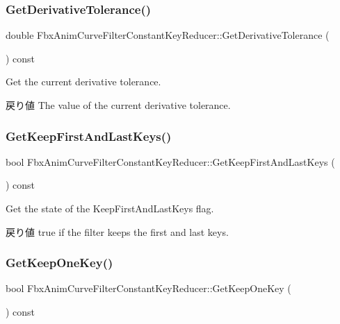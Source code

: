 \subsubsection{\texorpdfstring{Get\+Derivative\+Tolerance()}{GetDerivativeTolerance()}}
{\footnotesize\ttfamily double Fbx\+Anim\+Curve\+Filter\+Constant\+Key\+Reducer\+::\+Get\+Derivative\+Tolerance (\begin{DoxyParamCaption}{ }\end{DoxyParamCaption}) const}

Get the current derivative tolerance. \begin{DoxyReturn}{戻り値}
The value of the current derivative tolerance. 
\end{DoxyReturn}
\mbox{\label{class_fbx_anim_curve_filter_constant_key_reducer_acb96f386ab154175fff45e7fdcbbfb3f}} 
\subsubsection{\texorpdfstring{Get\+Keep\+First\+And\+Last\+Keys()}{GetKeepFirstAndLastKeys()}}
{\footnotesize\ttfamily bool Fbx\+Anim\+Curve\+Filter\+Constant\+Key\+Reducer\+::\+Get\+Keep\+First\+And\+Last\+Keys (\begin{DoxyParamCaption}{ }\end{DoxyParamCaption}) const}

Get the state of the Keep\+First\+And\+Last\+Keys flag. \begin{DoxyReturn}{戻り値}
{\ttfamily true} if the filter keeps the first and last keys. 
\end{DoxyReturn}
\mbox{\label{class_fbx_anim_curve_filter_constant_key_reducer_a098b50fec08965071f8eb5aec3a02e78}} 
\subsubsection{\texorpdfstring{Get\+Keep\+One\+Key()}{GetKeepOneKey()}}
{\footnotesize\ttfamily bool Fbx\+Anim\+Curve\+Filter\+Constant\+Key\+Reducer\+::\+Get\+Keep\+One\+Key (\begin{DoxyParamCaption}{ }\end{DoxyParamCaption}) const}

